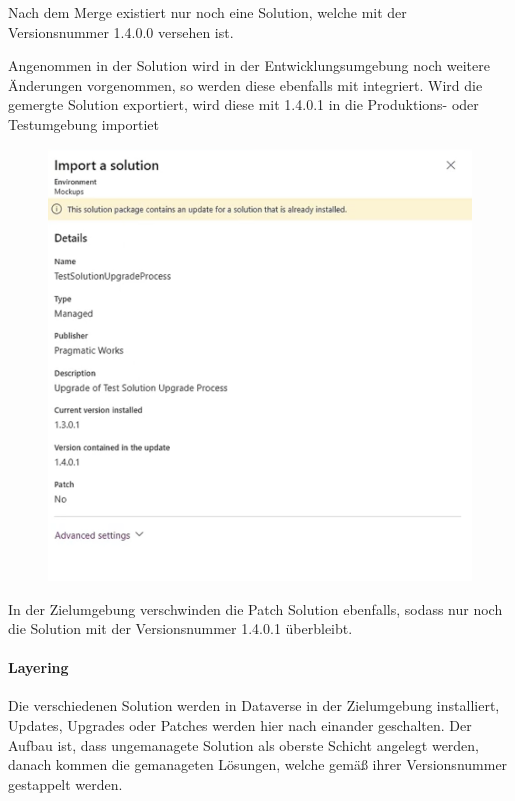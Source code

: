 Nach dem Merge existiert nur noch eine Solution, welche mit der Versionsnummer 1.4.0.0 versehen ist.

Angenommen in der Solution wird in der Entwicklungsumgebung noch weitere Änderungen vorgenommen, so werden diese ebenfalls mit integriert. Wird die gemergte Solution exportiert, wird diese mit 1.4.0.1 in die Produktions- oder Testumgebung importiet

\begin{figure}[H]
	\centering
	\includegraphics[scale = 0.3]{attachment/chapter_13/Scc051}
\end{figure}

In der Zielumgebung verschwinden die Patch Solution ebenfalls, sodass nur noch die Solution mit der Versionsnummer 1.4.0.1 überbleibt.

\paragraph{Layering}
Die verschiedenen Solution werden in Dataverse in der Zielumgebung installiert, Updates, Upgrades oder Patches werden hier nach einander geschalten. Der Aufbau ist, dass ungemanagete Solution als oberste Schicht angelegt werden, danach kommen die gemanageten Lösungen, welche gemäß ihrer Versionsnummer gestappelt werden. 

